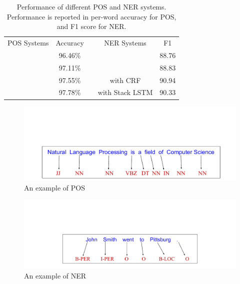 \documentclass{sfuthesis}
\begin{document}
\begin{table}[]
\centering
\caption{Performance of different POS and NER systems. Performance is reported in per-word accuracy for POS, and F1 score for NER. }
\label{table:my-performance}
\begin{tabular}{cclcc}
POS Systems       & Accuracy &  & NER Systems           & F1
\\ \cline{1-2} \cline{4-5} 
\text{\cite{mccallum2000maximum}} & 96.46\%                      &  & \text{\cite{florian2003named}}                 & 88.76                  \\
\text{\cite{collins2002discriminative}}    & 97.11\%                      &  & \text{\cite{huang2015bidirectional}}           & 88.83                  \\
\text{\cite{huang2015bidirectional}}       & 97.55\%                      &  & \text{\cite{lample2016neural}} with CRF        & 90.94                  \\
\text{\cite{ling2015finding}}              & 97.78\%                      &  & \text{\cite{lample2016neural}} with Stack LSTM & 90.33                 
\end{tabular}
\end{table}

\begin{figure}
  \centering
  \includegraphics[scale=0.5]{posex.pdf}
 \caption{An example of POS}
  \label{fig:pos-ex}
\end{figure}

\begin{figure}
  \centering
  \includegraphics[scale=0.5]{nerex.pdf}
 \caption{An example of NER}
  \label{fig:ner-ex}
\end{figure}
\end{document}
